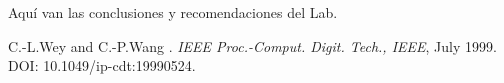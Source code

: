 \documentclass[12pt,a4paper]{article} %
\begin{document}
Aquí van las conclusiones y recomendaciones del Lab.

\begin{thebibliography}{3}


C.-L.Wey and C.-P.Wang
.
\newblock \emph{IEEE Proc.-Comput. Digit. Tech., IEEE}, July 1999.
\newblock DOI: 10.1049/ip-cdt:19990524.

\end{thebibliography}
\end{document}
